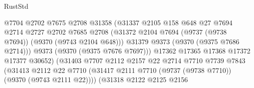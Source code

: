 \begin{lexlean}{RustStd}
\begin{coremodule}
                                        @7704
                                        @2702
                                        @7675
                                        @2708
                                        @31358
                                        (@31337
                                          @2105
                                          @158
                                          @648
                                          @27
                                          @7694
                                          @2714
                                          @2727
                                          @2702
                                          @7685
                                          @2708
                                          (@31372
                                            @2104
                                            @7694
                                            (@9737 (@9738 @7694))
                                            (@9370 (@9743 @2104 @648)))
                                          @31379
                                          @9373
                                          (@9370 (@9375 @7686 @2714)))
                                        @9373
                                        (@9370 (@9375 @7676 @7697)))
                                      @17362
                                      @17365
                                      @17368
                                      @17372
                                      @17377
                                      @30652)
                                    (@31403
                                      @7707
                                      @2112
                                      @2157
                                      @22
                                      @2714
                                      @7710
                                      @7739
                                      @7843
                                      (@31413
                                        @2112
                                        @22
                                        @7710
                                        (@31417
                                          @2111
                                          @7710
                                          (@9737 (@9738 @7710))
                                          (@9370 (@9743 @2111 @22))))
                                      (@31318
                                        @2122
                                        @2125
                                        @2156

\end{coremodule}
\end{lexlean}
